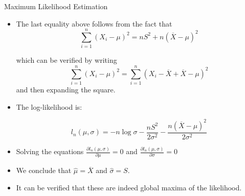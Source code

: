 \documentclass[handout]{beamer}
\begin{document}
\begin{frame}{Maximum Likelihood Estimation}
\scriptsize{
\begin{itemize}
\item The last equality above follows from the fact that 
\begin{displaymath}
 \sum_{i=1}^n(X_i -\mu)^2=nS^2+n(\overline{X}-\mu)^2
\end{displaymath}

which can be verified by writing
\begin{displaymath}
\sum_{i=1}^n(X_i -\mu)^2 = \sum_{i=1}^n(X_i - \overline{X} + \overline{X} -\mu)^2 
\end{displaymath}
and then expanding the square.
 
\item The log-likelihood is: 
 
 \begin{displaymath}
l_n(\mu,\sigma) = -n\log \sigma - \frac{nS^2}{2\sigma^2} - \frac{n(\overline{X}-\mu)^2}{2\sigma^2} 
 \end{displaymath}   

 
\item Solving the equations $\frac{\partial l_n(\mu,\sigma)}{\partial \mu} = 0$ and $\frac{\partial l_n(\mu,\sigma)}{\partial \sigma} = 0$

\item We conclude that $\hat{\mu} = \overline{X}$ and $\hat{\sigma}=S$. 

\item It can be verified that these are indeed global maxima of the likelihood.

\end{itemize}



} 
 

 
\end{frame}
\end{document}
